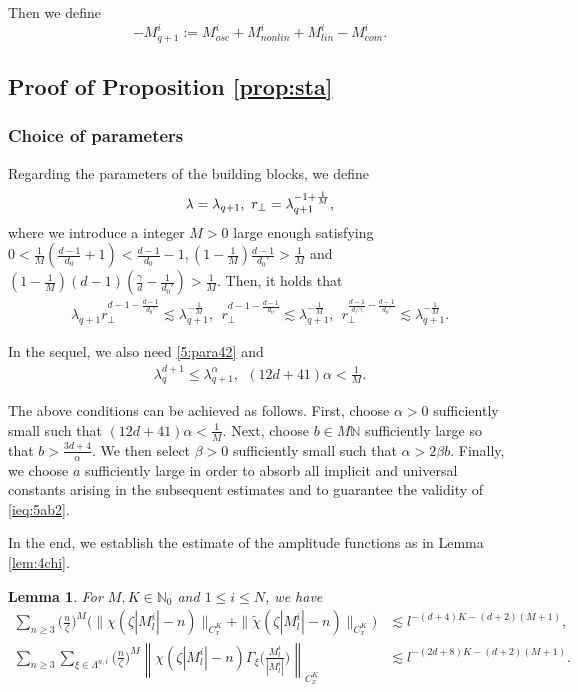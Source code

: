\documentclass[10pt,a4paper]{amsart}
\numberwithin{equation}{section}
\newtheorem{lemma}[theorem]{Lemma}
\def\({{\Big(}}
\def\){{\Big)}}
\newcommand{\norm}[1]{\left\|#1\right\|}
\def\geq{\geqslant}
\def\leq{\leqslant}
\def\({{\Big(}}
\def\){{\Big)}}
\def\bl{\begin{lemma}}
\def\el{\end{lemma}}
\def\geq{\geqslant}
\def\leq{\leqslant}
\begin{document}
Then we define 
$$-{M}^i _{q+1}:=M^i_{osc}+M^i_{nonlin}+M^i_{lin}-M^i_{com} .$$ 




\subsection{ Proof of Proposition \ref{prop:sta}}\label{sec:proof1}

\subsubsection{Choice of parameters}\label{sec:5choicepara}

 
Regarding the parameters of the building blocks, we define 
\begin{align}
  \lambda=\lambda_{q+1},\ r_\perp=\lambda_{q+1}^{-1+\frac1{M}}, \notag
\end{align}
where   we introduce a integer $M>0$ large enough  satisfying $0< \frac1M(\frac{d-1}{d_0}+1)<\frac{d-1}{d_0}-1, (1-\frac{1}{M})\frac{d-1}{d_0'}>\frac{1}{M}$ and $(1-\frac{1}{M})(d-1)(\frac{\gamma}{d}-\frac{1}{d_0'})>\frac{1}{M}$.   Then, it holds that 
\begin{align}
    \lambda_{q+1}r_\perp^{d-1-\frac{d-1}{d_0'}}\lesssim \lambda_{q+1}^{-\frac{1}{M}},\  \ r_\perp^{d-1-\frac{d-1}{d_0}}\lesssim\lambda_{q+1}^{-\frac{1}{M}},\ \   r_\perp^{\frac{d-1}{d/\gamma}-\frac{d-1}{d_0'}}\lesssim\lambda_{q+1}^{-\frac1M}.\label{para5lam}
\end{align}
 

In the sequel, we also need \eqref{5:para42} and \begin{align}
   \lambda_{q}^{ d+1}\leq\lambda_{q+1}^\alpha,\ \ (12d+41)\alpha<\frac1M. \label{para55}
 \end{align} 

 The above conditions can be achieved as follows. 
First, choose $\alpha>0$ sufficiently small such that $(12d+41)\alpha<\frac1M.$ Next, choose $b\in M\mathbb{N}$ sufficiently large so that
$b>\frac{3d+4}{\alpha}.$ We then select
$\beta>0$ sufficiently small such that
$\alpha>2\beta b.$ Finally, we choose
$a$ sufficiently large in order to absorb all implicit and universal constants arising in the subsequent estimates and to guarantee the validity of \eqref{ieq:5ab2}.  


 
In the end, we establish the estimate of the amplitude functions  as in Lemma \ref{lem:4chi}.
\bl\label{lem:5chi} 
 For $ M,K\in\mathbb{N}_0$ and $1\leq i\leq N$, we have
\begin{align*}
    \sum_{n\geq3} \(\frac{n}{\zeta }\)^M\(\|\chi(\zeta |M^i_l|-n)\|_{C_{x}^K}+ \|\tilde{\chi}(\zeta |M^i_l|-n)\|_{C_{x}^K}\)&\lesssim l^{- (d+4)K-(d+2)(M+1)},\\
     \sum_{n\geq3}\sum_{\xi\in\Lambda^{n,i}}\(\frac{n}{\zeta }\)^M\norm{\chi(\zeta |M^i_l|-n)\Gamma_\xi\(\frac{M^i_l}{|M^i_l|}\)}_{C_{x}^K}& \lesssim l^{-(2d+8)K-(d+2)(M+1)}.
\end{align*}
\el 
\end{document}
